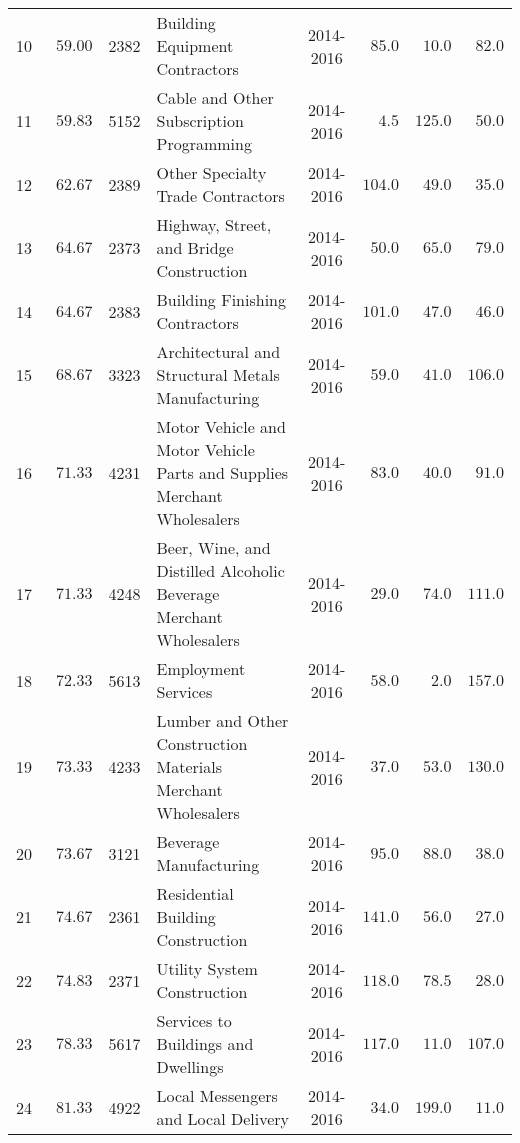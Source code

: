 \documentclass[9pt, oneside]{article}   	%
\begin{document}
\begin{longtable}{cccp{2.0in}cccc}
10  & $\phantom{0}59.00$ & 2382 & Building Equipment Contractors & 2014-2016 & $\phantom{0}85.0$ & $\phantom{0}10.0$ & $\phantom{0}82.0$ \\
11  & $\phantom{0}59.83$ & 5152 & Cable and Other Subscription Programming & 2014-2016 & $\phantom{00}4.5$ & $125.0$ & $\phantom{0}50.0$ \\
12  & $\phantom{0}62.67$ & 2389 & Other Specialty Trade Contractors & 2014-2016 & $104.0$ & $\phantom{0}49.0$ & $\phantom{0}35.0$ \\
13  & $\phantom{0}64.67$ & 2373 & Highway, Street, and Bridge Construction & 2014-2016 & $\phantom{0}50.0$ & $\phantom{0}65.0$ & $\phantom{0}79.0$ \\
14  & $\phantom{0}64.67$ & 2383 & Building Finishing Contractors & 2014-2016 & $101.0$ & $\phantom{0}47.0$ & $\phantom{0}46.0$ \\
15  & $\phantom{0}68.67$ & 3323 & Architectural and Structural Metals Manufacturing & 2014-2016 & $\phantom{0}59.0$ & $\phantom{0}41.0$ & $106.0$ \\
16  & $\phantom{0}71.33$ & 4231 & Motor Vehicle and Motor Vehicle Parts and Supplies Merchant Wholesalers & 2014-2016 & $\phantom{0}83.0$ & $\phantom{0}40.0$ & $\phantom{0}91.0$ \\
17  & $\phantom{0}71.33$ & 4248 & Beer, Wine, and Distilled Alcoholic Beverage Merchant Wholesalers & 2014-2016 & $\phantom{0}29.0$ & $\phantom{0}74.0$ & $111.0$ \\
18  & $\phantom{0}72.33$ & 5613 & Employment Services & 2014-2016 & $\phantom{0}58.0$ & $\phantom{00}2.0$ & $157.0$ \\
19  & $\phantom{0}73.33$ & 4233 & Lumber and Other Construction Materials Merchant Wholesalers & 2014-2016 & $\phantom{0}37.0$ & $\phantom{0}53.0$ & $130.0$ \\
20  & $\phantom{0}73.67$ & 3121 & Beverage Manufacturing & 2014-2016 & $\phantom{0}95.0$ & $\phantom{0}88.0$ & $\phantom{0}38.0$ \\
21  & $\phantom{0}74.67$ & 2361 & Residential Building Construction & 2014-2016 & $141.0$ & $\phantom{0}56.0$ & $\phantom{0}27.0$ \\
22  & $\phantom{0}74.83$ & 2371 & Utility System Construction & 2014-2016 & $118.0$ & $\phantom{0}78.5$ & $\phantom{0}28.0$ \\
23  & $\phantom{0}78.33$ & 5617 & Services to Buildings and Dwellings & 2014-2016 & $117.0$ & $\phantom{0}11.0$ & $107.0$ \\
24  & $\phantom{0}81.33$ & 4922 & Local Messengers and Local Delivery & 2014-2016 & $\phantom{0}34.0$ & $199.0$ & $\phantom{0}11.0$ \\

\end{longtable}
\end{document}
